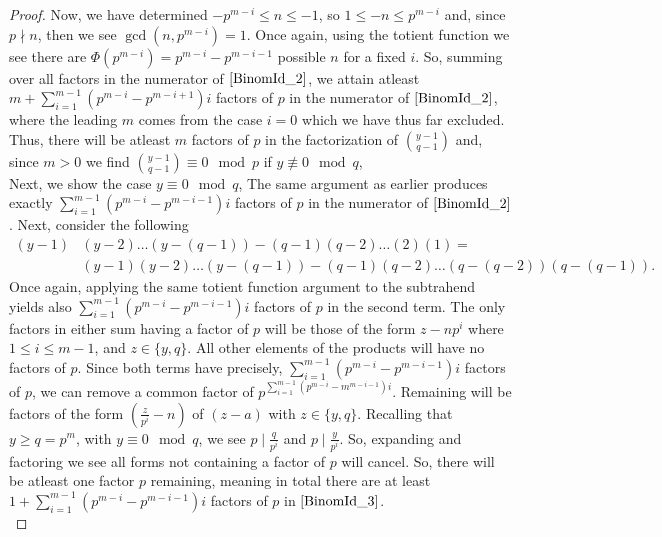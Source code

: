 \begin{proof}
Now, we have determined \(-p^{m-i} \le n \le -1\), so \(1 \le -n \le p^{m-i}\) and, since \(p \nmid n\), then we see \(\gcd\left( n, p^{m-i} \right) = 1\). Once again, using the totient function we see there are \(\Phi\left( p^{m-i} \right)  = p^{m-i} - p^{m-i-1}\) possible \(n\) for a fixed \(i\). So, summing over all factors in the numerator of \(\refeq{BinomId_2}\), we attain atleast \( m + \sum_{i= 1}^{m-1} \left( p^{m-i} - p^{m-i+1} \right) i\) factors of \(p\) in the numerator of \(\refeq{BinomId_2}\), where the leading \(m\) comes from the case \(i = 0\) which we have thus far excluded. Thus, there will be atleast \(m\) factors of \(p\) in the factorization of \(\binom{y-1}{q-1}\) and, since \(m> 0\) we find \(\binom{y-1}{q-1} \equiv 0 \mod p\) if \(y \not \equiv 0 \mod q\),\\
Next, we show the case \(y \equiv 0 \mod q\), The same argument as earlier produces exactly \(\sum_{i= 1}^{m-1} \left( p^{m-i} - p^{m-i-1} \right)i \) factors of \(p\) in the numerator of \(\refeq{BinomId_2}\). Next, consider the following
\begin{align}
	\left( y-1 \right) &\left( y-2 \right) \ldots \left( y-\left( q-1 \right)  \right) - \left( q-1 \right) \left( q-2 \right) \ldots \left( 2 \right) \left( 1 \right) =\\ &\left( y-1 \right) \left( y-2 \right) \ldots \left( y-\left( q-1 \right)  \right)  - \left( q-1 \right) \left( q-2 \right) \ldots \left( q-\left( q-2 \right)  \right) \left( q-\left( q-1 \right)  \right) .\label{BinomId_3}
\end{align}
Once again, applying the same totient function argument to the subtrahend yields also \(\sum_{i= 1}^{m-1} \left( p^{m-i} - p^{m-i-1} \right) i\) factors of \(p\) in the second term. The only factors in either sum having a factor of \(p\) will be those of the form \(z - np^{i}\) where \( 1\le i \le m-1\), and \(z \in \{y, q\} \). All other elements of the products will have no factors of \(p\). Since both terms have precisely, \(\sum_{i= 1}^{m-1} \left( p^{m-i}- p^{m-i-1} \right) i\) factors of \(p\), we can remove a common factor of \(p^{\sum_{i= 1}^{m-1} \left( p^{m-i} - m^{m-i-1} \right) i}\). Remaining will be factors of the form \(\left( \frac{z}{p^{i}} - n \right) \) of \(\left( z-a \right) \) with \(z \in \{y, q\} \). Recalling that \(y \ge q = p^{m}\), with \(y \equiv 0 \mod q\), we see \(p \mid \frac{q}{p^{i}}\) and \(p \mid \frac{y}{p^{i}}\). So, expanding and factoring  we see all forms not containing a factor of \(p\) will cancel. So, there will be atleast one factor \(p\) remaining, meaning in total there are at least \(1 + \sum_{i= 1}^{m-1} \left( p^{m-i} - p^{m-i-1} \right) i \) factors of \(p\) in \(\refeq{BinomId_3}\).\\

\end{proof}
